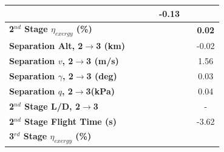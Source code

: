 \begin{table}[ht!]
\begin{tabular}{l c c c c c c}
		& \firstsecondSeparationgammaqStandardNoReturn
		& \firstsecondSeparationgammaqFiftyFiveNoReturn
		& \firstsecondSeparationgammaqSixtyNoReturn
		&-0.13
		\\
		\hline 
		\textbf{2$^{nd}$ Stage $\eta_{exergy}$ (\%)}
		& \textbf{\secondExergyEffqFortyNoReturn}
		& \textbf{\secondExergyEffqFortyFiveNoReturn}
		& \textbf{\secondExergyEffqStandardNoReturn}
		& \textbf{\secondExergyEffqFiftyFiveNoReturn}
		& \textbf{\secondExergyEffqSixtyNoReturn}
		& \textbf{0.02}
		\\
		\textbf{Separation Alt, 2$\rightarrow$3 (km)}
		& \secondthirdSeparationAltqFortyNoReturn
		& \secondthirdSeparationAltqFortyFiveNoReturn
		& \secondthirdSeparationAltqStandardNoReturn
		& \secondthirdSeparationAltqFiftyFiveNoReturn
		& \secondthirdSeparationAltqSixtyNoReturn
		&-0.02
		\\
		\textbf{Separation $v$, 2$\rightarrow$3 (m/s)}
		& \secondthirdSeparationvqFortyNoReturn
		& \secondthirdSeparationvqFortyFiveNoReturn
		& \secondthirdSeparationvqStandardNoReturn
		& \secondthirdSeparationvqFiftyFiveNoReturn
		& \secondthirdSeparationvqSixtyNoReturn
		&1.56
		\\
		\textbf{Separation $\gamma$, 2$\rightarrow$3 (deg)}
		& \secondthirdSeparationgammaqFortyNoReturn
		& \secondthirdSeparationgammaqFortyFiveNoReturn
		& \secondthirdSeparationgammaqStandardNoReturn
		& \secondthirdSeparationgammaqFiftyFiveNoReturn
		& \secondthirdSeparationgammaqSixtyNoReturn
		&0.03
		\\
		\textbf{Separation $q$, 2$\rightarrow$3(kPa)}
		& \secondthirdSeparationqqFortyNoReturn
		& \secondthirdSeparationqqFortyFiveNoReturn
		& \secondthirdSeparationqqStandardNoReturn
		& \secondthirdSeparationqqFiftyFiveNoReturn
		& \secondthirdSeparationqqSixtyNoReturn
		&0.04
		\\
		\textbf{2$^{nd}$ Stage L/D, 2$\rightarrow$3}
		& \secondthirdSeparationLDqFortyNoReturn
		& \secondthirdSeparationLDqFortyFiveNoReturn
		& \secondthirdSeparationLDqStandardNoReturn
		& \secondthirdSeparationLDqFiftyFiveNoReturn
		& \secondthirdSeparationLDqSixtyNoReturn
		& -
		\\
		\textbf{2$^{nd}$ Stage Flight Time (s)}
		& \secondFlightTimeqFortyNoReturn
		& \secondFlightTimeqFortyFiveNoReturn
		& \secondFlightTimeqStandardNoReturn
		& \secondFlightTimeqFiftyFiveNoReturn
		& \secondFlightTimeqSixtyNoReturn
		&-3.62
		\\
		\hline 
		\textbf{3$^{rd}$ Stage $\eta_{exergy}$ (\%)}
		& \textbf{\thirddExergyEffqFortyNoReturn}
		& \textbf{\thirddExergyEffqFortyFiveNoReturn}

\end{tabular}
\end{table}

